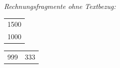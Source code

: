                     \vspace{2em} \noindent {}\lbrack \textit{Rechnungsfragmente ohne Textbezug:}\rbrack \pend
\vspace{1em}
                     \pstart \noindent 
 \begin{tabular}{c}
                                   1500\\
                                   1000\\
                                  \end{tabular}
                    \begin{tabular}{cc}
                                  999 &333\\
                                 \end{tabular}
                     \pend 
 


 


 


 


 

